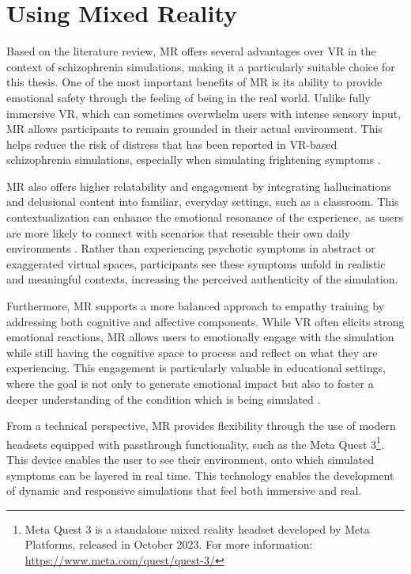\section{Using Mixed Reality}

Based on the literature review, MR offers several advantages over VR in the context of schizophrenia simulations, making it a particularly suitable choice for this thesis. One of the most important benefits of MR is its ability to provide emotional safety through the feeling of being in the real world. Unlike fully immersive VR, which can sometimes overwhelm users with intense sensory input, MR allows participants to remain grounded in their actual environment. This helps reduce the risk of distress that has been reported in VR-based schizophrenia simulations, especially when simulating frightening symptoms \cite{Zare-Bidaki2022}.

MR also offers higher relatability and engagement by integrating hallucinations and delusional content into familiar, everyday settings, such as a classroom. This contextualization can enhance the emotional resonance of the experience, as users are more likely to connect with scenarios that resemble their own daily environments \cite{Krogmeier2024}. Rather than experiencing psychotic symptoms in abstract or exaggerated virtual spaces, participants see these symptoms unfold in realistic and meaningful contexts, increasing the perceived authenticity of the simulation.

\vspace{1em}

Furthermore, MR supports a more balanced approach to empathy training by addressing both cognitive and affective components. While VR often elicits strong emotional reactions, MR allows users to emotionally engage with the simulation while still having the cognitive space to process and reflect on what they are experiencing. This engagement is particularly valuable in educational settings, where the goal is not only to generate emotional impact but also to foster a deeper understanding of the condition which is being simulated \cite{Martingano2021, Rueda2020}.

\vspace{1em}

From a technical perspective, MR provides flexibility through the use of modern headsets equipped with passthrough functionality, such as the Meta Quest 3\footnote{Meta Quest 3 is a standalone mixed reality headset developed by Meta Platforms, released in October 2023. For more information: \url{https://www.meta.com/quest/quest-3/}}. This device enables the user to see their environment, onto which simulated symptoms can be layered in real time. This technology enables the development of dynamic and responsive simulations that feel both immersive and real.


